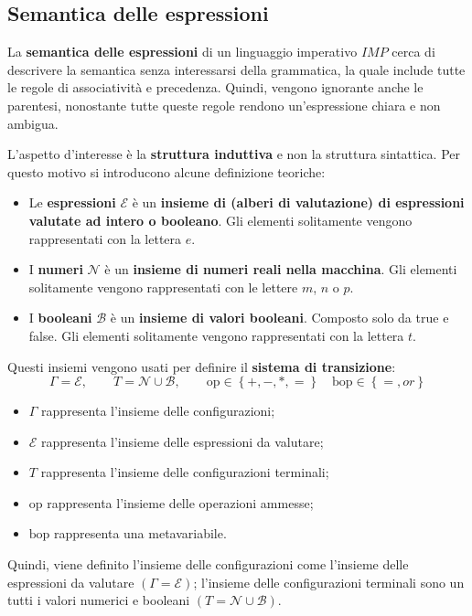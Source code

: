 \documentclass[a4paper]{article}
\begin{document}
	\subsection{Semantica delle espressioni}
	
	La \textcolor{Red3}{\textbf{semantica delle espressioni}} di un linguaggio imperativo $IMP$ cerca di descrivere la semantica senza interessarsi della grammatica, la quale include tutte le regole di associatività e precedenza. Quindi, vengono ignorante anche le parentesi, nonostante tutte queste regole rendono un'espressione chiara e non ambigua.\newline
	
	\noindent
	L'aspetto d'interesse è la \textbf{struttura induttiva} e non la struttura sintattica. Per questo motivo si introducono alcune definizione teoriche:
	\begin{itemize}
		\item Le \textcolor{Red3}{\textbf{espressioni}} $\mathcal{E}$ è un \textbf{insieme di (alberi di valutazione) di espressioni valutate ad intero o booleano}. Gli elementi solitamente vengono rappresentati con la lettera $e$.
		
		\item I \textcolor{Red3}{\textbf{numeri}} $\mathcal{N}$ è un \textbf{insieme di numeri reali nella macchina}. Gli elementi solitamente vengono rappresentati con le lettere $m$, $n$ o $p$.
		
		\item I \textcolor{Red3}{\textbf{booleani}} $\mathcal{B}$ è un \textbf{insieme di valori booleani}. Composto solo da \textsf{true} e \textsf{false}. Gli elementi solitamente vengono rappresentati con la lettera $t$.
	\end{itemize}
	Questi insiemi vengono usati per definire il \textcolor{Red3}{\textbf{sistema di transizione}}:
	\begin{equation*}
		\Gamma = \mathcal{E}, \hspace{2em} T = \mathcal{N} \cup \mathcal{B}, \hspace{2em} \mathrm{op}\in\left\{+,-,*,=\right\} \hspace{1em} \mathrm{bop} \in \left\{=, or\right\}
	\end{equation*}
	\begin{itemize}
		\item $\Gamma$ rappresenta l'insieme delle configurazioni;
		\item $\mathcal{E}$ rappresenta l'insieme delle espressioni da valutare;
		\item $T$ rappresenta l'insieme delle configurazioni terminali;
		\item $\mathrm{op}$ rappresenta l'insieme delle operazioni ammesse;
		\item $\mathrm{bop}$ rappresenta una metavariabile.
	\end{itemize}
	Quindi, viene definito l'insieme delle configurazioni come l'insieme delle espressioni da valutare $\left(\Gamma = \mathcal{E}\right)$; l'insieme delle configurazioni terminali sono un tutti i valori numerici e booleani $\left(T = \mathcal{N} \cup \mathcal{B}\right)$.\newpage
	
\end{document}
